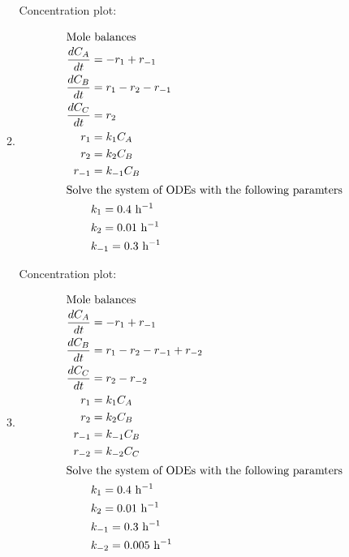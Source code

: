 \documentclass[12pt]{article}
\begin{document}
\begin{enumerate}
\begin{enumerate}
        Concentration plot:

        \begin{center}
            
        \end{center}

        \item 
        \begin{align*}
            \intertext{Mole balances}
            \frac{dC_A}{dt} &= -r_1 + r_{-1} \\
            \frac{dC_B}{dt} &= r_1 - r_2 - r_{-1} \\
            \frac{dC_C}{dt} &= r_2 \\
            r_1 &= k_1 C_A \\
            r_2 &= k_2 C_B \\
            r_{-1} &= k_{-1} C_B \\
            \intertext{Solve the system of ODEs with the following paramters}
            & k_1 = 0.4 \text{ h$^{-1}$} \\
            & k_2 = 0.01 \text{ h$^{-1}$} \\
            & k_{-1} = 0.3 \text{ h$^{-1}$}
        \end{align*}

        Concentration plot:

        \begin{center}
            
        \end{center}

        \item 
        \begin{align*}
            \intertext{Mole balances}
            \frac{dC_A}{dt} &= -r_1 + r_{-1} \\
            \frac{dC_B}{dt} &= r_1 - r_2 - r_{-1} + r_{-2} \\
            \frac{dC_C}{dt} &= r_2 - r_{-2}\\
            r_1 &= k_1 C_A \\
            r_2 &= k_2 C_B \\
            r_{-1} &= k_{-1} C_B \\
            r_{-2} &= k_{-2} C_C \\
            \intertext{Solve the system of ODEs with the following paramters}
            & k_1 = 0.4 \text{ h$^{-1}$} \\
            & k_2 = 0.01 \text{ h$^{-1}$} \\
            & k_{-1} = 0.3 \text{ h$^{-1}$} \\
            & k_{-2} = 0.005 \text{ h$^{-1}$}
        \end{align*}


\end{enumerate}
\end{enumerate}
\end{document}
